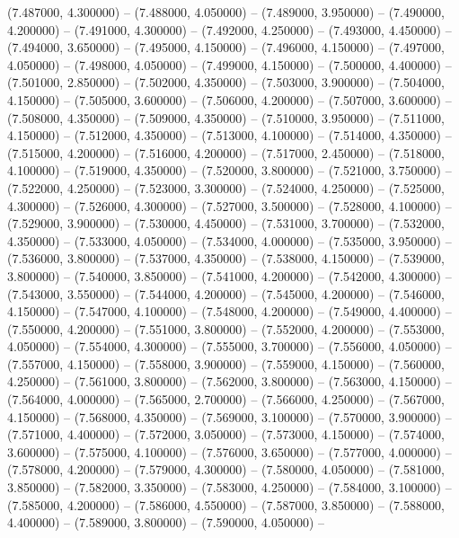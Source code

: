 (7.487000, 4.300000) -- 
(7.488000, 4.050000) -- 
(7.489000, 3.950000) -- 
(7.490000, 4.200000) -- 
(7.491000, 4.300000) -- 
(7.492000, 4.250000) -- 
(7.493000, 4.450000) -- 
(7.494000, 3.650000) -- 
(7.495000, 4.150000) -- 
(7.496000, 4.150000) -- 
(7.497000, 4.050000) -- 
(7.498000, 4.050000) -- 
(7.499000, 4.150000) -- 
(7.500000, 4.400000) -- 
(7.501000, 2.850000) -- 
(7.502000, 4.350000) -- 
(7.503000, 3.900000) -- 
(7.504000, 4.150000) -- 
(7.505000, 3.600000) -- 
(7.506000, 4.200000) -- 
(7.507000, 3.600000) -- 
(7.508000, 4.350000) -- 
(7.509000, 4.350000) -- 
(7.510000, 3.950000) -- 
(7.511000, 4.150000) -- 
(7.512000, 4.350000) -- 
(7.513000, 4.100000) -- 
(7.514000, 4.350000) -- 
(7.515000, 4.200000) -- 
(7.516000, 4.200000) -- 
(7.517000, 2.450000) -- 
(7.518000, 4.100000) -- 
(7.519000, 4.350000) -- 
(7.520000, 3.800000) -- 
(7.521000, 3.750000) -- 
(7.522000, 4.250000) -- 
(7.523000, 3.300000) -- 
(7.524000, 4.250000) -- 
(7.525000, 4.300000) -- 
(7.526000, 4.300000) -- 
(7.527000, 3.500000) -- 
(7.528000, 4.100000) -- 
(7.529000, 3.900000) -- 
(7.530000, 4.450000) -- 
(7.531000, 3.700000) -- 
(7.532000, 4.350000) -- 
(7.533000, 4.050000) -- 
(7.534000, 4.000000) -- 
(7.535000, 3.950000) -- 
(7.536000, 3.800000) -- 
(7.537000, 4.350000) -- 
(7.538000, 4.150000) -- 
(7.539000, 3.800000) -- 
(7.540000, 3.850000) -- 
(7.541000, 4.200000) -- 
(7.542000, 4.300000) -- 
(7.543000, 3.550000) -- 
(7.544000, 4.200000) -- 
(7.545000, 4.200000) -- 
(7.546000, 4.150000) -- 
(7.547000, 4.100000) -- 
(7.548000, 4.200000) -- 
(7.549000, 4.400000) -- 
(7.550000, 4.200000) -- 
(7.551000, 3.800000) -- 
(7.552000, 4.200000) -- 
(7.553000, 4.050000) -- 
(7.554000, 4.300000) -- 
(7.555000, 3.700000) -- 
(7.556000, 4.050000) -- 
(7.557000, 4.150000) -- 
(7.558000, 3.900000) -- 
(7.559000, 4.150000) -- 
(7.560000, 4.250000) -- 
(7.561000, 3.800000) -- 
(7.562000, 3.800000) -- 
(7.563000, 4.150000) -- 
(7.564000, 4.000000) -- 
(7.565000, 2.700000) -- 
(7.566000, 4.250000) -- 
(7.567000, 4.150000) -- 
(7.568000, 4.350000) -- 
(7.569000, 3.100000) -- 
(7.570000, 3.900000) -- 
(7.571000, 4.400000) -- 
(7.572000, 3.050000) -- 
(7.573000, 4.150000) -- 
(7.574000, 3.600000) -- 
(7.575000, 4.100000) -- 
(7.576000, 3.650000) -- 
(7.577000, 4.000000) -- 
(7.578000, 4.200000) -- 
(7.579000, 4.300000) -- 
(7.580000, 4.050000) -- 
(7.581000, 3.850000) -- 
(7.582000, 3.350000) -- 
(7.583000, 4.250000) -- 
(7.584000, 3.100000) -- 
(7.585000, 4.200000) -- 
(7.586000, 4.550000) -- 
(7.587000, 3.850000) -- 
(7.588000, 4.400000) -- 
(7.589000, 3.800000) -- 
(7.590000, 4.050000) -- 
